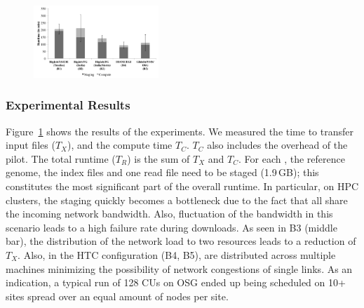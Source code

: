 \documentclass[conference]{IEEEtran}
\begin{document}


\begin{figure}[t]
 \up\up
 \centering
 \includegraphics[width=0.42\textwidth]{../perf/interop/128-bfast-egi-fg-xsede-osg-with-staging.pdf}
 \caption{\up}
\label{fig:perf_perf-bfast-bj}
\end{figure}


\subsubsection*{Experimental Results}


Figure~\ref{fig:perf_perf-bfast-bj} shows the results of the
experiments. We measured the time to transfer input files ($T_X$), and
the compute time $T_C$. $T_C$ also includes the overhead of the pilot.
The total runtime ($T_R$) is the sum of $T_X$ and $T_C$.  For each
\cu, the reference genome, the index files and one read file need to
be staged (1.9\,GB); this constitutes the most significant part of the
overall runtime. In particular, on HPC clusters, the staging quickly
becomes a bottleneck due to the fact that all \cus share the incoming
network bandwidth.  Also, fluctuation of the bandwidth in this
scenario leads to a high failure rate during downloads. As seen in B3
(middle bar), the distribution of the network load to two resources
leads to a reduction of $T_{X}$. Also, in the HTC configuration (B4,
B5), \cus are distributed across multiple machines minimizing the
possibility of network congestions of single links. As an indication,
a typical run of 128 CUs on OSG ended up being scheduled on 10+ sites
spread over an equal amount of nodes per site.
\end{document}
